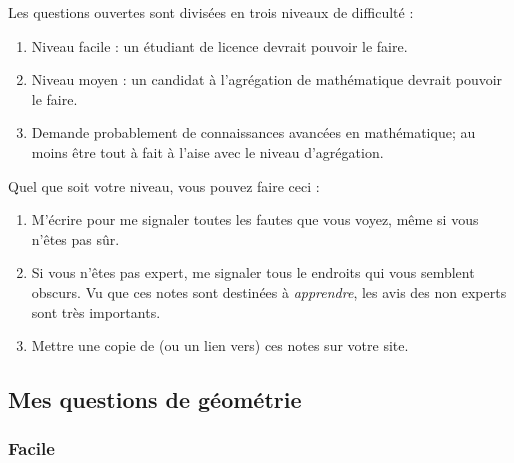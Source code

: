Les questions ouvertes sont divisées en trois niveaux de difficulté : 
\begin{enumerate}
    \item
        Niveau facile : un étudiant de licence devrait pouvoir le faire.
    \item
        Niveau moyen : un candidat à l'agrégation de mathématique devrait pouvoir le faire.
    \item
        Demande probablement de connaissances avancées en mathématique; au moins être tout à fait à l'aise avec le niveau d'agrégation.
\end{enumerate}

Quel que soit votre niveau, vous pouvez faire ceci :

\begin{enumerate}
    \item
        M'écrire pour me signaler toutes les fautes que vous voyez, même si vous n'êtes pas sûr.
    \item
        Si vous n'êtes pas expert, me signaler tous le endroits qui vous semblent obscurs. Vu que ces notes sont destinées à \emph{apprendre}, les avis des non experts sont très importants.
    \item
        Mettre une copie de (ou un lien vers) ces notes sur votre site.
\end{enumerate}

\subsection{Mes questions de géométrie}

\subsubsection{Facile}

